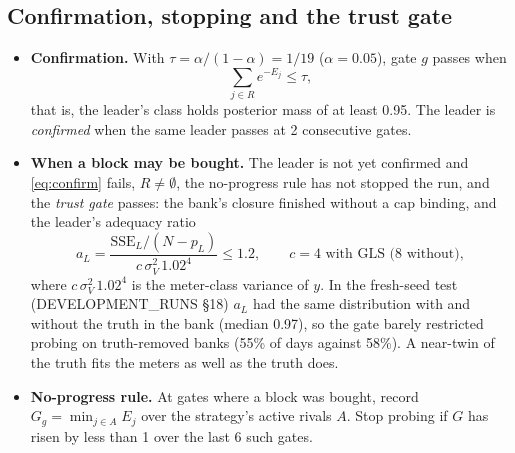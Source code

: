 \documentclass[11pt]{article}
\theoremstyle{definition}
\begin{document}
{\subsection{Confirmation, stopping and the trust gate}
\begin{itemize}
  \item \textbf{Confirmation.} With $\tau=\alpha/(1-\alpha)=1/19$ ($\alpha=0.05$), gate $g$ passes when
  \begin{equation}\label{eq:confirm}
    \sum_{j\in R}e^{-E_j}\le\tau ,
  \end{equation}
  that is, the leader's class holds posterior mass of at least 0.95. The leader is \emph{confirmed} when the same leader passes at 2 consecutive gates.
  \item \textbf{When a block may be bought.} The leader is not yet confirmed and \eqref{eq:confirm} fails, $R\neq\emptyset$, the no-progress rule has not stopped the run, and the \emph{trust gate} passes: the bank's closure finished without a cap binding, and the leader's adequacy ratio
  \begin{equation}\label{eq:adequacy}
    a_L=\frac{\mathrm{SSE}_L/(N-p_L)}{c\,\sigma_V^2\,1.02^4}\le 1.2,\qquad c=4\text{ with GLS ($8$ without)},
  \end{equation}
  where $c\,\sigma_V^2\,1.02^4$ is the meter-class variance of $y$. In the fresh-seed test (DEVELOPMENT\_RUNS \S18) $a_L$ had the same distribution with and without the truth in the bank (median 0.97), so the gate barely restricted probing on truth-removed banks (55\% of days against 58\%). A near-twin of the truth fits the meters as well as the truth does.
  \item \textbf{No-progress rule.} At gates where a block was bought, record $G_g=\min_{j\in A}E_j$ over the strategy's active rivals $A$. Stop probing if $G$ has risen by less than 1 over the last 6 such gates.
\end{itemize}

}
\end{document}
